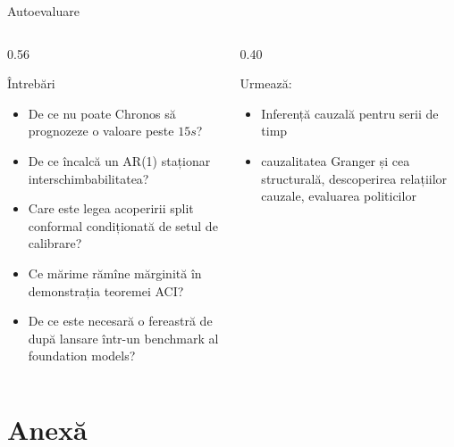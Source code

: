 \begin{frame}{Autoevaluare}
\itemsize{\small}
\begin{columns}[T]
\begin{column}{0.56\textwidth}
\begin{block}{Întrebări}
\begin{itemize}
    \item De ce nu poate Chronos să prognozeze o valoare peste $15s$?
    \item De ce încalcă un AR(1) staționar interschimbabilitatea?
    \item Care este legea acoperirii split conformal condiționată de setul de calibrare?
    \item Ce mărime rămîne mărginită în demonstrația teoremei ACI?
    \item De ce este necesară o fereastră de după lansare într-un benchmark al foundation models?
\end{itemize}
\end{block}
\end{column}
\begin{column}{0.40\textwidth}
\begin{block}{Urmează: }
\begin{itemize}
    \item Inferență cauzală pentru serii de timp
    \item cauzalitatea Granger și cea structurală, descoperirea relațiilor cauzale, evaluarea politicilor
\end{itemize}
\end{block}
\end{column}
\end{columns}
\end{frame}


\section{Anexă}


